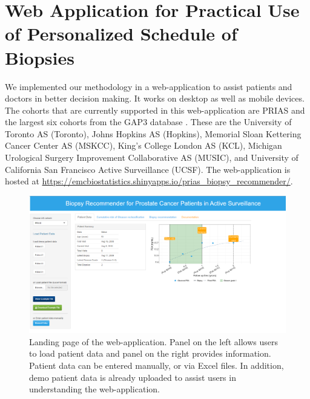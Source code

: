 \section{Web Application for Practical Use of Personalized Schedule of Biopsies}

We implemented our methodology in a web-application to assist patients and doctors in better decision making. It works on desktop as well as mobile devices. The cohorts that are currently supported in this web-application are PRIAS and the largest six cohorts from the GAP3 database \citep{gap3_2018}. These are the University of Toronto AS (Toronto), Johns Hopkins AS (Hopkins), Memorial Sloan Kettering Cancer Center AS (MSKCC), King's College London AS (KCL), Michigan Urological Surgery Improvement Collaborative AS (MUSIC), and University of California San Francisco Active Surveillance (UCSF). The web-application is hosted at \url{https://emcbiostatistics.shinyapps.io/prias_biopsy_recommender/}. 

\begin{figure}[!htb]
\centerline{\includegraphics[width=\columnwidth]{images/app/landing_page.png}}
\caption{Landing page of the web-application. Panel on the left allows users to load patient data and panel on the right provides information. Patient data can be entered manually, or via Excel files. In addition, demo patient data is already uploaded to assist users in understanding the web-application.}
\label{fig:landing_page}
\end{figure}